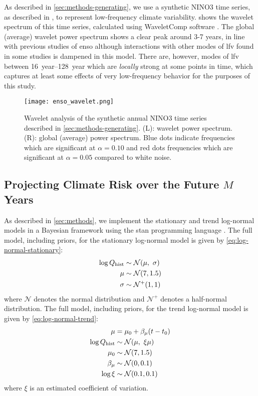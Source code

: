 \documentclass[
]{agujournal2018}
\newcommand{\normal}{\mathcal{N}}
\begin{document}
As described in \cref{sec:methods-generating}, we use a synthetic NINO3 time series, as described in \citep{Ramesh:2016hf}, to represent low-frequency climate variability.
 shows the wavelet spectrum of this time series, calculated using WaveletComp software \citep{Roesch:wlBQQoIs}.
The global (average) wavelet power spectrum shows a clear peak around 3-7 years, in line with previous studies of \gls{enso} although interactions with other modes of \acrfull{lfv} found in some studies \citep{Jin:1994wq} is dampened in this model.
There are, however, modes of \gls{lfv} between \SIrange{16}{128}{year} which are \emph{locally} strong at some points in time, which captures at least some effects of very low-frequency behavior for the purposes of this study.
\begin{figure}
  \texttt{[image: enso\_wavelet.png]}
  \caption{
    Wavelet analysis of the synthetic annual NINO3 time series described in \cref{sec:methods-generating}.
    (L): wavelet power spectrum.
    (R): global (average) power spectrum.
    Blue dots indicate frequencies which are significant at $\alpha=0.10$ and red dots frequencies which are significant at $\alpha=0.05$ compared to white noise.
  }\label{fig:enso-ts}
\end{figure}

\subsection{Projecting Climate Risk over the Future $M$ Years}

As described in \cref{sec:methods}, we implement the stationary and trend log-normal models in a Bayesian framework using the stan programming language \citep{Carpenter:2017ke}.
The full model, including priors, for the stationary log-normal model is given by \cref{eq:log-normal-stationary}:
\begin{align}\label{eq:log-normal-stationary}
  \begin{split}
    \log Q_\text{hist} & \sim \normal \qty(\mu, \ \sigma) \\
    \mu &\sim \normal \qty(7, 1.5) \\
    \sigma &\sim \normal^+ \qty(1, 1)
  \end{split}
\end{align}
where $\normal$ denotes the normal distribution and $\normal^+$ denotes a half-normal distribution.
The full model, including priors, for the trend log-normal model is given by \cref{eq:log-normal-trend}:
\begin{align}\label{eq:log-normal-trend}
  \begin{split}
    \mu &= \mu_0 + \beta_\mu \qty(t - t_0) \\
    \log Q_\text{hist} & \sim \normal \qty(\mu, \ \xi \mu) \\
    \mu_0 & \sim \normal \qty(7, 1.5) \\
    \beta_\mu & \sim \normal \qty(0, 0.1) \\
    \log \xi & \sim \normal \qty(0.1, 0.1)
  \end{split}
\end{align}
where $\xi$ is an estimated coefficient of variation.
\end{document}
